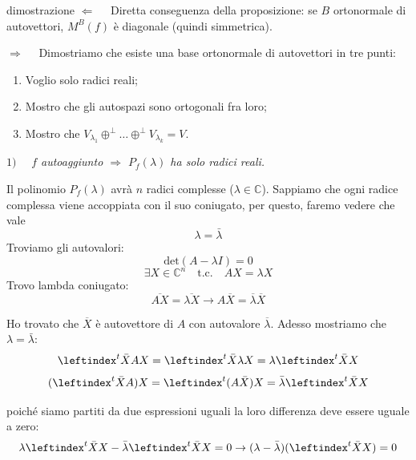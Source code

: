 \documentclass[x11names]{article}
\begin{document}
\begin{es}{dimostrazione}
$\Longleftarrow \quad$ Diretta conseguenza della proposizione: se $B$ ortonormale di autovettori, $M^B\left(f\right)$ è diagonale (quindi simmetrica). 

$\Longrightarrow \quad$ Dimostriamo che esiste una base ortonormale di autovettori in tre punti:
\begin{enumerate}
	\item Voglio solo radici reali;
	\item Mostro che gli autospazi sono ortogonali fra loro;
	\item Mostro che $V_{\lambda_{1}} \oplus^\perp \dots \oplus^\perp V_{\lambda_{k}} = V$.
\end{enumerate} 

$1) \quad$ \textit{$f$ autoaggiunto $\Longrightarrow$ $P_{f}(\lambda)$ ha solo radici reali.} 

Il polinomio $P_{f}(\lambda)$ avrà $n$ radici complesse ($\lambda \in \mathbb{C}$). Sappiamo che ogni radice complessa viene accoppiata con il suo coniugato, per questo, faremo vedere che vale
\[
\lambda = \bar{\lambda} 
\]
Troviamo gli autovalori:
\[
\text{det}\left(A - \lambda I\right) = 0 
\]
\[
\exists X \in \mathbb{C}^n \quad \text{t.c.} \quad AX = \lambda X
\]
Trovo lambda coniugato:
\[
\overline{AX} = \overline{\lambda X} \to A\overline{X} = \overline{\lambda} \overline{X}
\]

Ho trovato che $\overline{X}$ è autovettore di $A$ con autovalore $\overline{\lambda}$. Adesso mostriamo che $\lambda = \bar{\lambda}$:
\[
\leftindex^{t}{\bar{X}}AX = \leftindex^{t}{\bar{X}} \lambda X = \lambda \leftindex^{t}{\bar{X}}  X
\]
\[
(\leftindex^{t}{\bar{X}}A)X = \leftindex^{t}{(A\bar{X})}X = \bar{\lambda} \leftindex^{t}{\bar{X}} X
\]

poiché siamo partiti da due espressioni uguali la loro differenza deve essere uguale a zero:
\[
\lambda \leftindex^{t}{\bar{X}}  X -  \bar{\lambda} \leftindex^{t}{\bar{X}} X = 0 \to (\lambda - \bar{\lambda})(\leftindex^{t}{\bar{X}} X) = 0
\]
\end{es}
\end{document}
